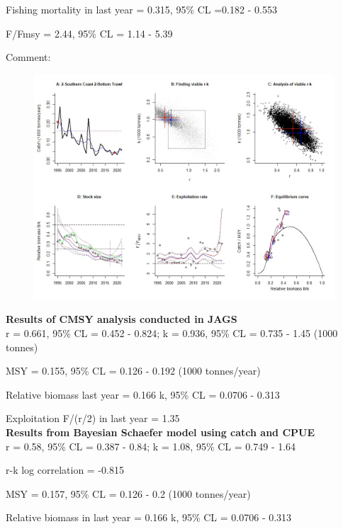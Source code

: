 \documentclass[12pt,a4paper]{article}\usepackage[]{graphicx}\usepackage[]{xcolor}
\begin{document}
Fishing mortality in last year = 0.315, 95\% CL =0.182 - 0.553

F/Fmsy  = 2.44, 95\% CL = 1.14 - 5.39 

 Comment:  

    \pagebreak

    \begin{figure}[ht]
    \centering
    \includegraphics[width=1.00\textwidth ext=.jpg type=jpg]{2-Southern Coast 2-Bottom Trawl_AN.jpg}
    \end{figure}

    \textbf{Results of CMSY analysis conducted in JAGS}\\

r = 0.661, 95\% CL = 0.452 - 0.824; k = 0.936, 95\% CL = 0.735 - 1.45 (1000 tonnes)

MSY = 0.155, 95\% CL = 0.126 - 0.192 (1000 tonnes/year)

Relative biomass last year = 0.166 k, 95\% CL = 0.0706 - 0.313

Exploitation F/(r/2) in last year = 1.35 \\

\textbf{Results from Bayesian Schaefer model using catch and CPUE}\\

r = 0.58, 95\% CL = 0.387 - 0.84; k = 1.08, 95\% CL = 0.749 - 1.64

r-k log correlation = -0.815

MSY = 0.157, 95\% CL = 0.126 - 0.2 (1000 tonnes/year)

Relative biomass in last year = 0.166 k, 95\% CL = 0.0706 - 0.313
\end{document}
